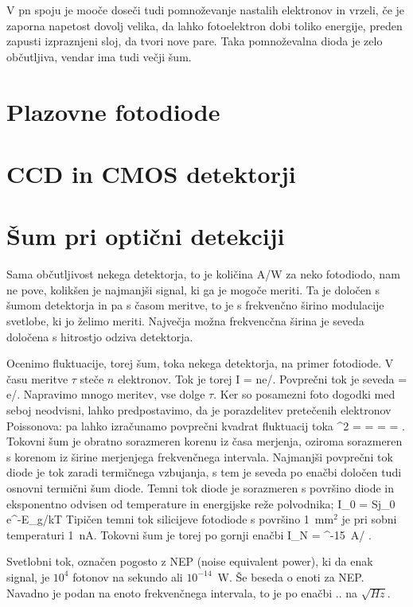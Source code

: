 V pn spoju je mooče doseči tudi pomnoževanje nastalih elektronov in vrzeli, če je zaporna napetost dovolj 
velika, da lahko fotoelektron dobi toliko energije, preden zapusti izpraznjeni sloj, da tvori nove pare.
Taka pomnoževalna dioda je zelo občutljiva, vendar ima tudi večji šum.

\section{Plazovne fotodiode}
 
\section{CCD in CMOS detektorji}
 
\section{Šum pri optični detekciji}
Sama občutljivost nekega detektorja, to je količina A/W za neko fotodiodo, nam ne pove, kolikšen 
je najmanjši signal, ki ga je mogoče meriti. Ta je določen s šumom detektorja in pa s časom 
meritve, to je s frekvenčno širino modulacije svetlobe, ki jo želimo meriti. Največja 
možna frekvencčna širina je seveda določena s hitrostjo odziva detektorja.

Ocenimo fluktuacije, torej šum, toka nekega detektorja, na primer fotodiode. V času
meritve $\tau$ steče $n$ elektronov. Tok je torej
\beq
I = ne/\tau.
\eeq
Povprečni tok je seveda
\beq
{} = e/\tau.
\eeq
Napravimo mnogo meritev, vse dolge $\tau$. Ker so posamezni foto dogodki med seboj neodvisni, 
lahko predpostavimo, da je porazdelitev pretečenih elektronov Poissonova: pa lahko izračunamo
povprečni kvadrat fluktuacij toka
\beq
\sigma^2 =  =   = 
 = .
\eeq
Tokovni šum je obratno sorazmeren korenu iz časa merjenja, oziroma sorazmeren s korenom
iz širine merjenjega frekvenčnega intervala. Najmanjši povprečni tok diode je tok zaradi
termičnega vzbujanja, s tem je seveda po enačbi določen tudi osnovni termični šum diode.
Temni tok diode je sorazmeren s površino diode in eksponentno odvisen od temperature in 
energijske reže polvodnika;
\beq
I_0 = Sj_0 e^{-E_g/kT}
\eeq
Tipičen temni tok silicijeve fotodiode s površino 1~mm$^2$ je pri sobni temperaturi 1~nA. 
Tokovni šum je torej po gornji enačbi
\beq
I_N =  ^{-15}~A/ \sqrt{\Delta \nu}.
\eeq

Svetlobni tok, označen pogosto z NEP (noise equivalent power), ki da enak signal, je $10^4 $
fotonov na sekundo ali $10^{-14}$~W. Še beseda o enoti za NEP. Navadno je podan na enoto 
frekvenčnega intervala, to je po enačbi .. na $\sqrt{Hz}$. 